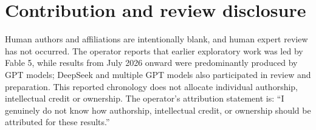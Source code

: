 \documentclass[11pt]{article}
\theoremstyle{remark}\newtheorem{remark}[theorem]{Remark}
\begin{document}
\section*{Contribution and review disclosure}
Human authors and affiliations are intentionally blank, and human expert review has not occurred.
The operator reports that earlier exploratory work was led by Fable 5, while results from July 2026 onward were predominantly produced by GPT models; DeepSeek and multiple GPT models also participated in review and preparation.
This reported chronology does not allocate individual authorship, intellectual credit or ownership.
The operator's attribution statement is: ``I genuinely do not know how authorship, intellectual credit, or ownership should be attributed for these results.''



\end{document}
